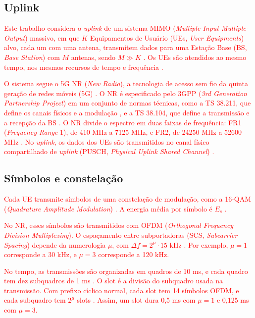 \subsection{Uplink}\label{subsec:uplink}
\textcolor{red}{Este trabalho considera o \textit{uplink} de um sistema MIMO (\textit{Multiple-Input Multiple-Output}) massivo, em que $K$ Equipamentos de Usuário (UEs, \textit{User Equipments}) alvo, cada um com uma antena, transmitem dados para uma Estação Base (BS, \textit{Base Station}) com $M$ antenas, sendo $M \gg K$ \cite{zhao2025jsac}. Os UEs são atendidos ao mesmo tempo, nos mesmos recursos de tempo e frequência \cite{zhao2025jsac}.}

\textcolor{red}{O sistema segue o 5G NR (\textit{New Radio}), a tecnologia de acesso sem fio da quinta geração de redes móveis (5G) \cite[p.~2]{lin-lee-5g}. O NR é especificado pelo 3GPP (\textit{3rd Generation Partnership Project}) em um conjunto de normas técnicas, como a TS 38.211, que define os canais físicos e a modulação \cite{3gpp-ts38211}, e a TS 38.104, que define a transmissão e a recepção da BS \cite{3gpp-ts38104}. O NR divide o espectro em duas faixas de frequência: FR1 (\textit{Frequency Range} 1), de 410 MHz a 7125 MHz, e FR2, de 24250 MHz a 52600 MHz \cite[Tab.~5.1-1]{3gpp-ts38104}. No \textit{uplink}, os dados dos UEs são transmitidos no canal físico compartilhado de \textit{uplink} (PUSCH, \textit{Physical Uplink Shared Channel}) \cite[Sec.~6.3.1]{3gpp-ts38211}.}

\subsection{Símbolos e constelação}\label{subsec:simbolos}
\textcolor{red}{Cada UE transmite símbolos de uma constelação de modulação, como a 16-QAM (\textit{Quadrature Amplitude Modulation}) \cite{zhao2025jsac}. A energia média por símbolo é $E_s$ \cite{zhao2025jsac}.}

\textcolor{red}{No NR, esses símbolos são transmitidos com OFDM (\textit{Orthogonal Frequency Division Multiplexing}). O espaçamento entre subportadoras (SCS, \textit{Subcarrier Spacing}) depende da numerologia $\mu$, com $\Delta f = 2^{\mu}\cdot 15$ kHz \cite[Tab.~4.2-1]{3gpp-ts38211}. Por exemplo, $\mu=1$ corresponde a 30 kHz, e $\mu=3$ corresponde a 120 kHz.}

\textcolor{red}{No tempo, as transmissões são organizadas em quadros de 10 ms, e cada quadro tem dez subquadros de 1 ms \cite[Sec.~4.3.1]{3gpp-ts38211}. O slot é a divisão do subquadro usada na transmissão. Com prefixo cíclico normal, cada slot tem 14 símbolos OFDM, e cada subquadro tem $2^{\mu}$ slots \cite[Tab.~4.3.2-1]{3gpp-ts38211}. Assim, um slot dura 0,5 ms com $\mu=1$ e 0,125 ms com $\mu=3$.}

